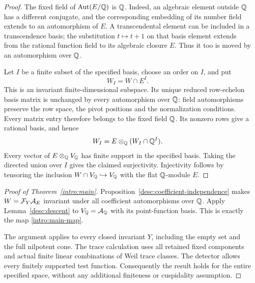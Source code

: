 \begin{proof}
The fixed field of $\operatorname{Aut}(E/\mathbb Q)$ is $\mathbb Q$. Indeed, an algebraic element
outside $\mathbb Q$ has a different conjugate, and the corresponding embedding
of its number field extends to an automorphism of $E$. A transcendental
element can be included in a transcendence basis; the substitution
$t\mapsto t+1$ on that basis element extends from the rational function
field to its algebraic closure $E$. Thus it too is moved by an
automorphism over $\mathbb Q$.

Let $I$ be a finite subset of the specified basis, choose an order on
$I$, and put
\[
W_I=W\cap E^I.
\]
This is an invariant finite-dimensional subspace. Its unique reduced
row-echelon basis matrix is unchanged by every automorphism over $\mathbb Q$:
field automorphisms preserve the row space, the pivot positions and the
normalization conditions. Every matrix entry therefore belongs to the
fixed field $\mathbb Q$. Its nonzero rows give a rational basis, and hence
\[
W_I=E\otimes_\mathbb Q(W_I\cap\mathbb Q^I).
\]
Every vector of $E\otimes_\mathbb Q V_\mathbb Q$ has finite support in the specified
basis. Taking the directed union over $I$ gives the claimed
surjectivity. Injectivity follows by tensoring the inclusion
$W\cap V_\mathbb Q\hookrightarrow V_\mathbb Q$ with the flat $\mathbb Q$-module $E$.
\end{proof}

\begin{proof}[Proof of Theorem~\ref{intro:main}]
Proposition~\ref{desc:coefficient-independence} makes
$W=\mathcal F_Y\mathcal A_E$ invariant under all coefficient automorphisms over $\mathbb Q$.
Apply Lemma~\ref{desc:descent} to $V_\mathbb Q=\mathcal A_\mathbb Q$ with its point-function
basis. This is exactly the map \eqref{intro:main-map}.

The argument applies to every closed invariant $Y$, including the empty
set and the full nilpotent cone. The trace calculation uses all retained
fixed components and actual finite linear combinations of Weil trace
classes. The detector allows every finitely supported test function.
Consequently the result holds for the entire specified space, without
any additional finiteness or cuspidality assumption.
\end{proof}


